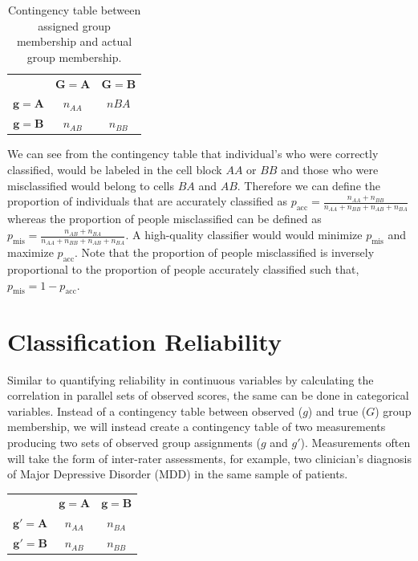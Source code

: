\documentclass[
  letterpaper,
  DIV=11,
  numbers=noendperiod]{scrreprt}
\begin{document}
\hypertarget{tbl-class}{}
\begin{longtable}[]{@{}ccc@{}}
\caption{\label{tbl-class}Contingency table between assigned group
membership and actual group membership.}\tabularnewline
\toprule\noalign{}
\endfirsthead
\endhead
\bottomrule\noalign{}
\endlastfoot
& \(\boldsymbol{G=A}\) & \(\boldsymbol{G=B}\) \\
\(\boldsymbol{g=A}\) & \(n_{AA}\) & \(n{BA}\) \\
\(\boldsymbol{g=B}\) & \(n_{AB}\) & \(n_{BB}\) \\
\end{longtable}

We can see from the contingency table that individual's who were
correctly classified, would be labeled in the cell block \(AA\) or
\(BB\) and those who were misclassified would belong to cells \(BA\) and
\(AB\). Therefore we can define the proportion of individuals that are
accurately classified as
\(p_{\text{acc}} = \frac{n_{AA} + n_{BB}}{n_{AA} + n_{BB} + n_{AB} + n_{BA}}\)
whereas the proportion of people misclassified can be defined as
\(p_{\text{mis}} = \frac{n_{AB} + n_{BA}}{n_{AA} + n_{BB} + n_{AB} + n_{BA}}\).
A high-quality classifier would would minimize \(p_{\text{mis}}\) and
maximize \(p_{\text{acc}}\). Note that the proportion of people
misclassified is inversely proportional to the proportion of people
accurately classified such that, \(p_{\text{mis}} = 1-p_{\text{acc}}\).

\hypertarget{classification-reliability}{%
\section{Classification Reliability}\label{classification-reliability}}

Similar to quantifying reliability in continuous variables by
calculating the correlation in parallel sets of observed scores, the
same can be done in categorical variables. Instead of a contingency
table between observed (\(g\)) and true (\(G\)) group membership, we
will instead create a contingency table of two measurements producing
two sets of observed group assignments (\(g\) and \(g'\)). Measurements
often will take the form of inter-rater assessments, for example, two
clinician's diagnosis of Major Depressive Disorder (MDD) in the same
sample of patients.

\begin{longtable}[]{@{}ccc@{}}
\toprule\noalign{}
\endhead
\bottomrule\noalign{}
\endlastfoot
& \(\boldsymbol{g=A}\) & \(\boldsymbol{g=B}\) \\
\(\boldsymbol{g'=A}\) & \(n_{AA}\) & \(n_{BA}\) \\
\(\boldsymbol{g'=B}\) & \(n_{AB}\) & \(n_{BB}\) \\
\end{longtable}
\end{document}
